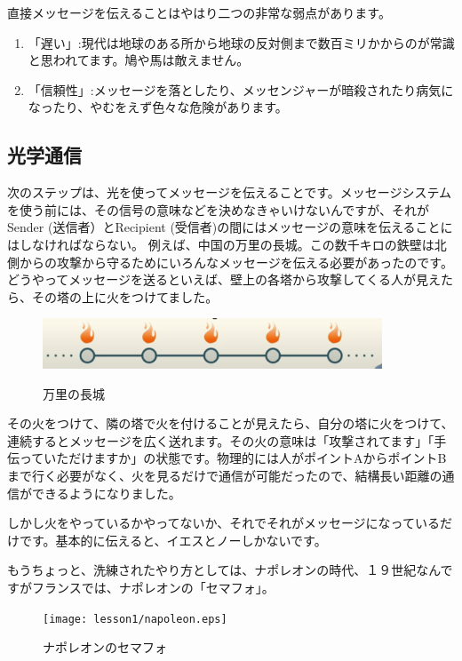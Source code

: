 直接メッセージを伝えることはやはり二つの非常な弱点があります。
\begin{enumerate}
    \item 「遅い」:現代は地球のある所から地球の反対側まで数百ミリかからのが常識と思われてます。鳩や馬は敵えません。
    \item 「信頼性」:メッセージを落としたり、メッセンジャーが暗殺されたり病気になったり、やむをえず色々な危険があります。
\end{enumerate}

\subsection{光学通信}

次のステップは、光を使ってメッセージを伝えることです。メッセージシステムを使う前には、その信号の意味などを決めなきゃいけないんですが、それがSender (送信者）とRecipient (受信者)の間にはメッセージの意味を伝えることにはしなければならない。
例えば、中国の万里の長城。この数千キロの鉄壁は北側からの攻撃から守るためにいろんなメッセージを伝える必要があったのです。どうやってメッセージを送るといえば、壁上の各塔から攻撃してくる人が見えたら、その塔の上に火をつけてました。
\begin{figure}[H]
    \centering
    \includegraphics[width=0.9\textwidth]{lesson1/万里の長城.eps}
    \label{fig: 1}
    \caption{万里の長城}
\end{figure}

その火をつけて、隣の塔で火を付けることが見えたら、自分の塔に火をつけて、連続するとメッセージを広く送れます。その火の意味は「攻撃されてます」「手伝っていただけますか」の状態です。物理的には人がポイントAからポイントBまで行く必要がなく、火を見るだけで通信が可能だったので、結構長い距離の通信ができるようになりました。

しかし火をやっているかやってないか、それでそれがメッセージになっているだけです。基本的に伝えると、イエスとノーしかないです。

もうちょっと、洗練されたやり方としては、ナポレオンの時代、１９世紀なんですがフランスでは、ナポレオンの「セマフォ」。
\begin{figure}[H]
    \centering
    \texttt{[image: lesson1/napoleon.eps]}
    \label{fig: 1}
    \caption{ナポレオンのセマフォ}
\end{figure}

